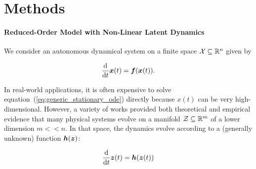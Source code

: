         

       

\section{Methods}
\label{sec:method}
\paragraph{Reduced-Order Model with Non-Linear Latent Dynamics}
We consider an autonomous dynamical system on a finite space $\operatorname{\mathcal{X}} \subseteq \mathbb{R}^n$ given by

\begin{equation}
    \label{eq:generic_stationary_ode}
        \frac{\mathrm{d}}{\mathrm{d}t}\boldsymbol{x}(t) = \boldsymbol{f}(\boldsymbol{x}(t)).
\end{equation}

In real-world applications, it is often expensive to solve equation~(\ref{eq:generic_stationary_ode}) directly because $x(t)$ can be very high-dimensional. However, a variety of works provided both theoretical \cite{holmes2012turbulence} and empirical \cite{noack2011reduced,chen2021discovering} evidence that many physical systems evolve on a manifold $\operatorname{\mathcal{Z}} \subseteq \mathbb{R}^m$ of a lower dimension $m << n$. In that space, the dynamics evolve according to a (generally unknown) function  $\boldsymbol{h}(\boldsymbol{z})$:

\begin{equation}
    \label{eq:latent_stationary_ode}
        \frac{\mathrm{d}}{\mathrm{d}t}\boldsymbol{z}(t) = \boldsymbol{h}(\boldsymbol{z}(t))
\end{equation}

